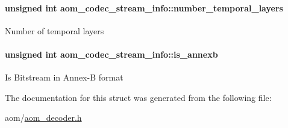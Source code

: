 \paragraph[{\texorpdfstring{number\+\_\+temporal\+\_\+layers}{number_temporal_layers}}]{\setlength{\rightskip}{0pt plus 5cm}unsigned int aom\+\_\+codec\+\_\+stream\+\_\+info\+::number\+\_\+temporal\+\_\+layers}\hypertarget{structaom__codec__stream__info_a8845a384d9d0b3d8670b8ad98b720c0e}{}\label{structaom__codec__stream__info_a8845a384d9d0b3d8670b8ad98b720c0e}
Number of temporal layers 
\paragraph[{\texorpdfstring{is\+\_\+annexb}{is_annexb}}]{\setlength{\rightskip}{0pt plus 5cm}unsigned int aom\+\_\+codec\+\_\+stream\+\_\+info\+::is\+\_\+annexb}\hypertarget{structaom__codec__stream__info_a1572ce7a1105c1db0a9dd43acb77b6c4}{}\label{structaom__codec__stream__info_a1572ce7a1105c1db0a9dd43acb77b6c4}
Is Bitstream in Annex-\/B format 

The documentation for this struct was generated from the following file\+:\begin{DoxyCompactItemize}
\item 
aom/\hyperlink{aom__decoder_8h}{aom\+\_\+decoder.\+h}\end{DoxyCompactItemize}
